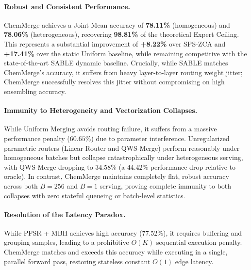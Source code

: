 \paragraph{Robust and Consistent Performance.} ChemMerge achieves a Joint Mean accuracy of \textbf{78.11\%} (homogeneous) and \textbf{78.06\%} (heterogeneous), recovering \textbf{98.81\%} of the theoretical Expert Ceiling. This represents a substantial improvement of \textbf{+8.22\%} over SPS-ZCA and \textbf{+17.41\%} over the static Uniform baseline, while remaining competitive with the state-of-the-art SABLE dynamic baseline. Crucially, while SABLE matches ChemMerge's accuracy, it suffers from heavy layer-to-layer routing weight jitter; ChemMerge successfully resolves this jitter without compromising on high ensembling accuracy.

\paragraph{Immunity to Heterogeneity and Vectorization Collapses.} While Uniform Merging avoids routing failure, it suffers from a massive performance penalty ($60.65\%$) due to parameter interference. Unregularized parametric routers (Linear Router and QWS-Merge) perform reasonably under homogeneous batches but collapse catastrophically under heterogeneous serving, with QWS-Merge dropping to $34.58\%$ (a $44.42\%$ performance drop relative to oracle). In contrast, ChemMerge maintains completely flat, robust accuracy across both $B=256$ and $B=1$ serving, proving complete immunity to both collapses with zero stateful queueing or batch-level statistics.

\paragraph{Resolution of the Latency Paradox.} While PFSR + MBH achieves high accuracy ($77.52\%$), it requires buffering and grouping samples, leading to a prohibitive $O(K)$ sequential execution penalty. ChemMerge matches and exceeds this accuracy while executing in a single, parallel forward pass, restoring stateless constant $O(1)$ edge latency.

